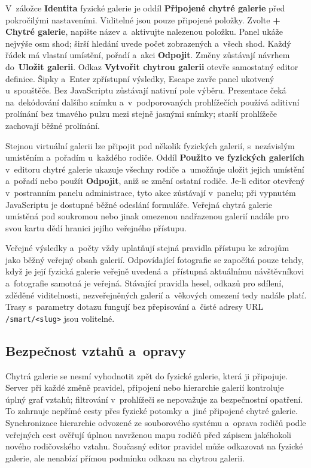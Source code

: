 \documentclass[11pt,a4paper]{article}
\newcommand{\ui}[1]{\textbf{#1}}
\begin{document}
V~záložce \ui{Identita} fyzické galerie je oddíl \ui{Připojené chytré
galerie} před pokročilými nastaveními. Viditelné jsou pouze připojené položky.
Zvolte \ui{+ Chytré galerie}, napište název a~aktivujte nalezenou položku.
Panel ukáže nejvýše osm shod; širší hledání uvede počet zobrazených a~všech
shod.
Každý řádek má vlastní umístění, pořadí a~akci \ui{Odpojit}.
Změny zůstávají návrhem do~\ui{Uložit galerii}. Odkaz \ui{Vytvořit chytrou
galerii} otevře samostatný editor definice. Šipky a~Enter zpřístupní
výsledky, Escape zavře panel ukotvený u~spouštěče. Bez JavaScriptu zůstávají
nativní pole výběru. Prezentace čeká na~dekódování dalšího snímku
a~v~podporovaných prohlížečích používá aditivní prolínání bez tmavého pulzu
mezi stejně jasnými snímky; starší prohlížeče zachovají běžné prolínání.

Stejnou virtuální galerii lze připojit pod několik fyzických galerií,
s~nezávislým umístěním a~pořadím u~každého rodiče. Oddíl \ui{Použito ve
fyzických galeriích} v~editoru chytré galerie ukazuje všechny rodiče a~umožňuje
uložit jejich umístění a~pořadí nebo použít \ui{Odpojit}, aniž se změní ostatní
rodiče. Je-li editor otevřený v~postranním panelu administrace, tyto akce
zůstávají v~panelu; při vypnutém JavaScriptu je dostupné běžné odeslání
formuláře. Veřejná chytrá galerie umístěná pod soukromou nebo jinak omezenou
nadřazenou galerií nadále pro svou kartu dědí hranici jejího veřejného přístupu.

Veřejné výsledky a~počty vždy uplatňují stejná pravidla přístupu ke zdrojům jako
běžný veřejný obsah galerií. Odpovídající fotografie se započítá pouze tehdy,
když je její fyzická galerie veřejně uvedená a~přístupná aktuálnímu
návštěvníkovi a~fotografie samotná je veřejná. Stávající pravidla hesel, odkazů
pro sdílení, zděděné viditelnosti, nezveřejněných galerií a~věkových omezení
tedy nadále platí. Trasy s~parametry dotazu fungují bez přepisování a~čisté
adresy URL \texttt{/smart/<slug>} jsou volitelné.

\subsection{Bezpečnost vztahů a~opravy}

Chytrá galerie se nesmí vyhodnotit zpět do fyzické galerie, která ji připojuje.
Server při každé změně pravidel, připojení nebo hierarchie galerií kontroluje
úplný graf vztahů; filtrování v~prohlížeči se nepovažuje za bezpečnostní
opatření. To zahrnuje nepřímé cesty přes fyzické potomky a~jiné připojené chytré
galerie. Synchronizace hierarchie odvozené ze souborového systému a~oprava
rodičů podle veřejných cest ověřují úplnou navrženou mapu rodičů před zápisem
jakéhokoli nového rodičovského vztahu. Současný editor pravidel může odkazovat
na fyzické galerie, ale nenabízí přímou podmínku odkazu na chytrou galerii.
\end{document}
